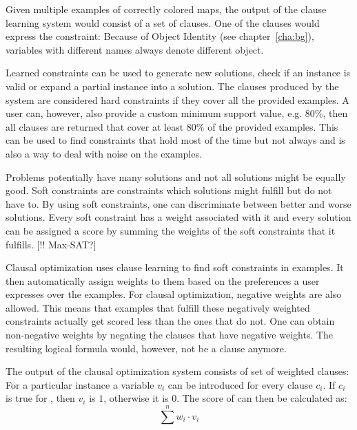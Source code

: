 \begin{ex}
Given multiple examples of correctly colored maps, the output of the clause learning system would consist of a set of clauses. One of the clauses would express the constraint: 
Because of Object Identity (see chapter~\ref{cha:bg}), variables with different names always denote different object.
\end{ex}

Learned constraints can be used to generate new solutions, check if an instance is valid or expand a partial instance into a solution.
The clauses produced by the system are considered hard constraints if they cover all the provided examples.
A user can, however, also provide a custom minimum support value, e.g. $80\%$, then all clauses are returned that cover at least $80\%$ of the provided examples.
This can be used to find constraints that hold most of the time but not always and is also a way to deal with noise on the examples.

Problems potentially have many solutions and not all solutions might be equally good.
Soft constraints are constraints which solutions might fulfill but do not have to.
By using soft constraints, one can discriminate between better and worse solutions.
Every soft constraint has a weight associated with it and every solution can be assigned a score by summing the weights of the soft constraints that it fulfills.
[!! Max-SAT?]

Clausal optimization uses clause learning to find soft constraints in examples.
It then automatically assign weights to them based on the preferences a user expresses over the examples.
For clausal optimization, negative weights are also allowed.
This means that examples that fulfill these negatively weighted constraints actually get scored less than the ones that do not.
One can obtain non-negative weights by negating the clauses that have negative weights.
The resulting logical formula would, however, not be a clause anymore.

The output of the clausal optimization system consists of set of weighted clauses: 
For a particular instance  a variable $v_i$ can be introduced for every clause $c_i$.
If $c_i$ is true for , then $v_i$ is $1$, otherwise it is $0$. The score of  can then be calculated as:
\begin{equation}
\sum\limits^n w_i \cdot v_i
\end{equation}

